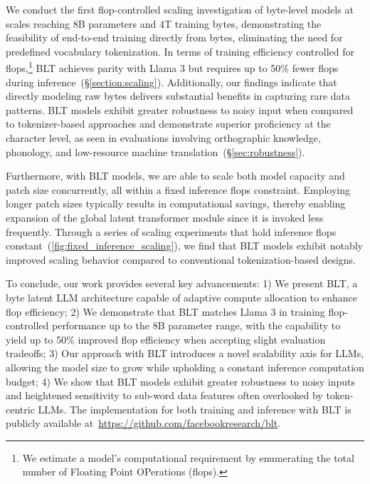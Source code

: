 We conduct the first flop-controlled scaling investigation of byte-level models at scales reaching 8B parameters and 4T training bytes, demonstrating the feasibility of end-to-end training directly from bytes, eliminating the need for predefined vocabulary tokenization. In terms of training efficiency controlled for flops,\footnote{We estimate a model's computational requirement by enumerating the total number of Floating Point OPerations (flops).} {\textsc BLT} achieves parity with Llama 3 but requires up to 50\% fewer flops during inference~(\S\ref{section:scaling}). Additionally, our findings indicate that directly modeling raw bytes delivers substantial benefits in capturing rare data patterns. {\textsc BLT} models exhibit greater robustness to noisy input when compared to tokenizer-based approaches and demonstrate superior proficiency at the character level, as seen in evaluations involving orthographic knowledge, phonology, and low-resource machine translation~(\S\ref{sec:robustness}).

Furthermore, with {\textsc BLT} models, we are able to scale both model capacity and patch size concurrently, all within a fixed inference flops constraint. Employing longer patch sizes typically results in computational savings, thereby enabling expansion of the global latent transformer module since it is invoked less frequently. Through a series of scaling experiments that hold inference flops constant~(\autoref{fig:fixed_inference_scaling}), we find that {\textsc BLT} models exhibit notably improved scaling behavior compared to conventional tokenization-based designs.

To conclude, our work provides several key advancements: 1) We present {\textsc BLT}, a byte latent LLM architecture capable of adaptive compute allocation to enhance flop efficiency; 2) We demonstrate that {\textsc BLT} matches Llama 3 in training flop-controlled performance up to the 8B parameter range, with the capability to yield up to 50\% improved flop efficiency when accepting slight evaluation tradeoffs; 3) Our approach with {\textsc BLT} introduces a novel scalability axis for LLMs, allowing the model size to grow while upholding a constant inference computation budget; 4) We show that {\textsc BLT} models exhibit greater robustness to noisy inputs and heightened sensitivity to sub-word data features often overlooked by token-centric LLMs. The implementation for both training and inference with {\textsc BLT} is publicly available at~\url{https://github.com/facebookresearch/blt}.

